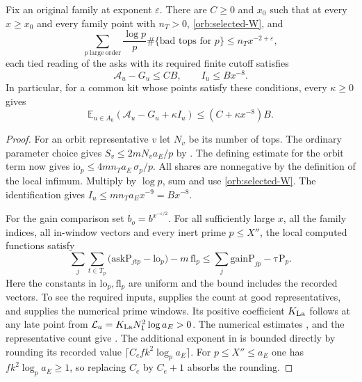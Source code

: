 \begin{proposition}\label{orb:selected}
Fix an original family  at exponent \(\varepsilon\).
There are \(C\ge0\) and \(x_0\) such that at every \(x\ge x_0\) and
every family point with \(n_T>0\), \eqref{orb:selected-W}, and
\[
  \sum_{p\ \mathrm{large\ order}}\frac{\log p}{p}
       \#\{\text{bad tops for }p\}\le n_Tx^{-2+\varepsilon},
\]
each tied reading of the asks with its required finite cutoff satisfies
\[
          \mathcal A_u-G_u\le CB,\qquad I_u\le Bx^{-8}.
\]
In particular, for a common kit whose points satisfy these conditions,
every \(\kappa\ge0\) gives
\[
   \mathbb E_{u\in A_0}(\mathcal A_u-G_u+\kappa I_u)
        \le (C+\kappa x^{-8})B .
\]
\end{proposition}
\begin{proof}
For an orbit representative \(v\) let \(N_v\) be its number of tops.
The ordinary parameter choice gives
\(S_v\le 2mN_v a_E/p\) by . The defining
estimate for the orbit term now gives
\(\mathrm{io}_p\le 4m n_T a_E\,\sigma_p/p\).
All shares are nonnegative by the definition of the local infimum.
Multiply by \(\log p\), sum and use \eqref{orb:selected-W}.
The identification  gives \(I_u\le
m n_T a_E x^{-9}=Bx^{-8}\).

For the gain comparison set \(b_o=b^{x^{-\varepsilon/2}}\).
For all sufficiently large \(x\), all the family indices, all
in-window vectors and every inert prime \(p\le X''\), the local
computed functions satisfy
\[
 \sum_j\sum_{t\in T_p}
    \bigl(\mathrm{askP}_{jtp}-\mathrm{lo}_p\bigr)-m\,\mathrm{fl}_p
 \le \sum_j\mathrm{gainP}_{jp}-\mathrm{\tau P}_p .
\]
Here the constants in \(\mathrm{lo}_p,\mathrm{fl}_p\) are uniform and
the bound includes the recorded vectors. To see the required inputs,
 supplies the count at good representatives,
and  supplies the numerical prime windows.
Its positive coefficient \(K_{\rm La}\) follows at any late point
from \(\mathcal L_a=K_{\rm La}N_1^2\log a_E>0\).
The numerical estimates ,  and
the representative count give . The additional
exponent in  is bounded directly
by rounding its recorded value
\(\lceil C_e f k^2\log_p a_E\rceil\).
For \(p\le X''\le a_E\) one has \(fk^2\log_p a_E\ge1\), so
replacing \(C_e\) by \(C_e+1\) absorbs the rounding.


\end{proof}

